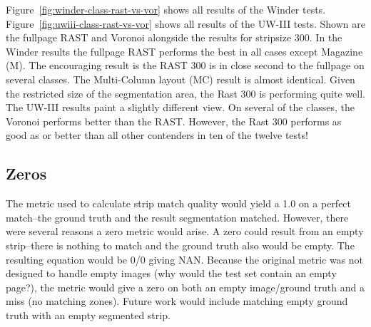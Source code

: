 \documentclass[conference]{IEEEtran}
\begin{document}
Figure~\ref{fig:winder-class-rast-vs-vor} shows all results of the Winder
tests. Figure~\ref{fig:uwiii-class-rast-vs-vor} shows all results of the
UW-III tests. Shown are the fullpage RAST and Voronoi alongside the results
for stripsize 300. In the Winder results the fullpage RAST performs the best in
all cases except Magazine (M). The encouraging result is the RAST 300 is in
close second to the fullpage on several classes. The Multi-Column layout (MC)
result is almost identical. Given the restricted size of the segmentation area,
the Rast 300 is performing quite well. The UW-III results paint a slightly
different view. On several of the classes, the Voronoi performs better than the
RAST. However, the Rast 300 performs as good as or better than all other
contenders in ten of the twelve tests!

\subsection{Zeros}

The metric used to calculate strip match quality would yield a 1.0 on a perfect
match--the ground truth and the result segmentation matched. However, there
were several reasons a zero metric would arise. A zero could result from an
empty strip--there is nothing to match and the ground truth also would be
empty. The resulting equation would be 0/0 giving NAN. Because the original
metric was not designed to handle empty images (why would the test set contain
an empty page?), the metric would give a zero on both an empty image/ground
truth and a miss (no matching zones). Future work would include matching empty
ground truth with an empty segmented strip.


%
%
\end{document}
